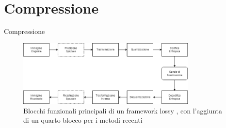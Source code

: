 \section{Compressione}

    \begin{frame}{Compressione}
        \begin{figure}[t!]
            \centering
            \includegraphics[width=0.8\textwidth]{Immagini/LossyCompressorDiagram.png}
            \caption{Blocchi funzionali principali di un framework lossy \cite{sadeeq2021image}, con l’aggiunta di un quarto blocco per i metodi recenti}
            \label{fig:LossyCompressorDiagram}
        \end{figure}
    \end{frame}